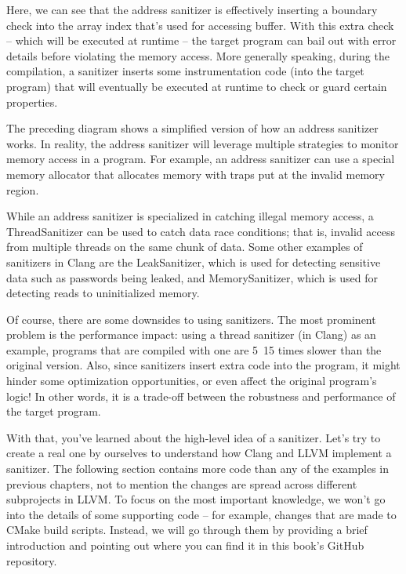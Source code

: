 Here, we can see that the address sanitizer is effectively inserting a boundary check into the array index that's used for accessing buffer. With this extra check – which will be executed at runtime – the target program can bail out with error details before violating the memory access. More generally speaking, during the compilation, a sanitizer inserts some instrumentation code (into the target program) that will eventually be executed at runtime to check or guard certain properties.

\begin{tcolorbox}[colback=blue!5!white,colframe=blue!75!black, fonttitle=\bfseries,title=Detecting overflow using an address sanitizer]	
\hspace*{0.7cm}The preceding diagram shows a simplified version of how an address sanitizer works. In reality, the address sanitizer will leverage multiple strategies to monitor memory access in a program. For example, an address sanitizer can use a special memory allocator that allocates memory with traps put at the invalid memory region.
\end{tcolorbox}

While an address sanitizer is specialized in catching illegal memory access, a ThreadSanitizer can be used to catch data race conditions; that is, invalid access from multiple threads on the same chunk of data. Some other examples of sanitizers in Clang are the LeakSanitizer, which is used for detecting sensitive data such as passwords being leaked, and MemorySanitizer, which is used for detecting reads to uninitialized memory.

Of course, there are some downsides to using sanitizers. The most prominent problem is the performance impact: using a thread sanitizer (in Clang) as an example, programs that are compiled with one are 5~15 times slower than the original version. Also, since sanitizers insert extra code into the program, it might hinder some optimization opportunities, or even affect the original program's logic! In other words, it is a trade-off between the robustness and performance of the target program.

With that, you've learned about the high-level idea of a sanitizer. Let's try to create a real one by ourselves to understand how Clang and LLVM implement a sanitizer. The following section contains more code than any of the examples in previous chapters, not to mention the changes are spread across different subprojects in LLVM. To focus on the most important knowledge, we won't go into the details of some supporting code – for example, changes that are made to CMake build scripts. Instead, we will go through them by providing a brief introduction and pointing out where you can find it in this book's GitHub repository.

